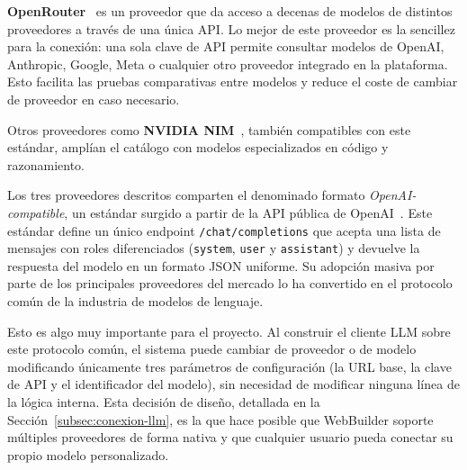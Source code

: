 \textbf{OpenRouter}~\cite{openrouter_docs} es un proveedor que da acceso a decenas de modelos de distintos proveedores a través de una única API. Lo mejor de este proveedor es la sencillez para la conexión: una sola clave de API permite consultar modelos de OpenAI, Anthropic, Google, Meta o cualquier otro proveedor integrado en la plataforma. Esto facilita las pruebas comparativas entre modelos y reduce el coste de cambiar de proveedor en caso necesario.

Otros proveedores como \textbf{NVIDIA NIM}~\cite{nvidia_nim_docs}, también compatibles con este estándar, amplían el catálogo con modelos especializados en código y razonamiento.

Los tres proveedores descritos comparten el denominado formato \textit{OpenAI-compatible}, un estándar surgido a partir de la API pública de OpenAI~\cite{openai_api_docs}. Este estándar define un único endpoint \texttt{/chat/completions} que acepta una lista de mensajes con roles diferenciados (\texttt{system}, \texttt{user} y \texttt{assistant}) y devuelve la respuesta del modelo en un formato JSON uniforme. Su adopción masiva por parte de los principales proveedores del mercado lo ha convertido en el protocolo común de la industria de modelos de lenguaje.

Esto es algo muy importante para el proyecto. Al construir el cliente LLM sobre este protocolo común, el sistema puede cambiar de proveedor o de modelo modificando únicamente tres parámetros de configuración (la URL base, la clave de API y el identificador del modelo), sin necesidad de modificar ninguna línea de la lógica interna. Esta decisión de diseño, detallada en la Sección~\ref{subsec:conexion-llm}, es la que hace posible que WebBuilder soporte múltiples proveedores de forma nativa y que cualquier usuario pueda conectar su propio modelo personalizado.